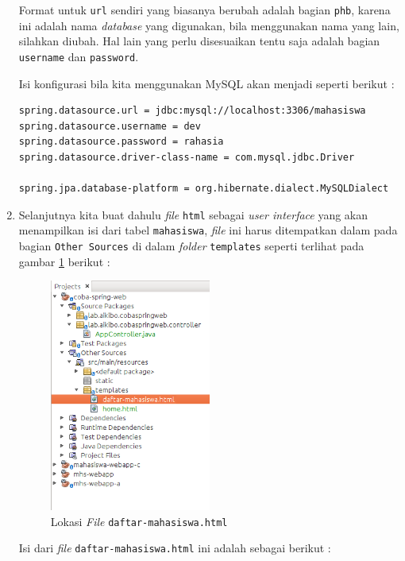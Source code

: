 \begin{enumerate}
	Format untuk \texttt{url} sendiri yang biasanya berubah adalah bagian \texttt{phb}, karena ini adalah nama \textit{database} yang digunakan, bila menggunakan nama yang lain, silahkan diubah. Hal lain yang perlu disesuaikan tentu saja adalah bagian \texttt{username} dan \texttt{password}.
	
	Isi konfigurasi bila kita menggunakan MySQL akan menjadi seperti berikut :
	
	\begin{lstlisting}
spring.datasource.url = jdbc:mysql://localhost:3306/mahasiswa
spring.datasource.username = dev
spring.datasource.password = rahasia
spring.datasource.driver-class-name = com.mysql.jdbc.Driver

spring.jpa.database-platform = org.hibernate.dialect.MySQLDialect
	\end{lstlisting}
	
	\item Selanjutnya kita buat dahulu \textit{file} \texttt{html} sebagai \textit{user interface} yang akan menampilkan isi dari tabel \texttt{mahasiswa}, \textit{file} ini harus ditempatkan dalam pada bagian \texttt{Other Sources} di dalam \textit{folder} \texttt{templates} seperti terlihat pada gambar \ref{fig:tempat-daftar-mahasiswa} berikut :
	
	\begin{figure}[H]
		\centering
		\includegraphics[width=0.5\textwidth]{./resources/009-tempat-daftar-mahasiswa}
		\caption{Lokasi \textit{File} \texttt{daftar-mahasiswa.html}}
		\label{fig:tempat-daftar-mahasiswa}
	\end{figure}
	
	Isi dari \textit{file} \texttt{daftar-mahasiswa.html} ini adalah sebagai berikut :
	

\end{enumerate}
